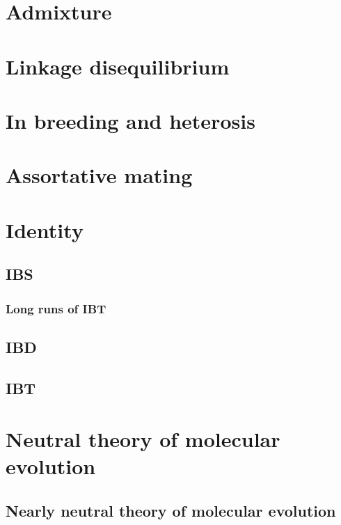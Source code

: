 \documentclass[]{book}
\theoremstyle{definition}
\theoremstyle{definition}
\theoremstyle{definition}
\theoremstyle{remark}
\begin{document}
\chapter{Admixture}\label{admixture}

\chapter{Linkage disequilibrium}\label{linkage-disequilibrium}

\chapter{In breeding and heterosis}\label{in-breeding-and-heterosis}

\chapter{Assortative mating}\label{assortative-mating}

\chapter{Identity}\label{identity}

\section{IBS}\label{ibs}

\subsection{Long runs of IBT}\label{long-runs-of-ibt}

\section{IBD}\label{ibd}

\section{IBT}\label{ibt}

\chapter{Neutral theory of molecular
evolution}\label{neutral-theory-of-molecular-evolution}

\section{Nearly neutral theory of molecular
evolution}\label{nearly-neutral-theory-of-molecular-evolution}
\end{document}

